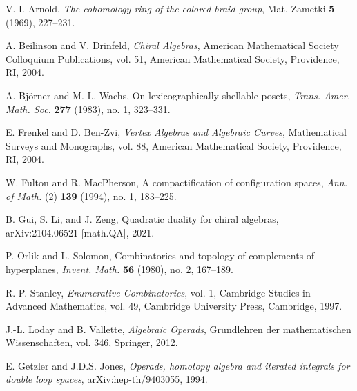 

\begin{thebibliography}{99}

V. I. Arnold, \emph{The cohomology ring of the colored braid group}, 
Mat. Zametki \textbf{5} (1969), 227--231.

 A. Beilinson and V. Drinfeld, \emph{Chiral Algebras}, American Mathematical Society Colloquium Publications, vol. 51, American Mathematical Society, Providence, RI, 2004.
 
 A. Björner and M. L. Wachs, On lexicographically shellable posets, \emph{Trans. Amer. Math. Soc.} \textbf{277} (1983), no. 1, 323--331.
 
 E. Frenkel and D. Ben-Zvi, \emph{Vertex Algebras and Algebraic Curves}, Mathematical Surveys and Monographs, vol. 88, American Mathematical Society, Providence, RI, 2004.
 
 W. Fulton and R. MacPherson, A compactification of configuration spaces, \emph{Ann. of Math.} (2) \textbf{139} (1994), no. 1, 183--225.
 
 B. Gui, S. Li, and J. Zeng, Quadratic duality for chiral algebras, arXiv:2104.06521 [math.QA], 2021.
 
 P. Orlik and L. Solomon, Combinatorics and topology of complements of hyperplanes, \emph{Invent. Math.} \textbf{56} (1980), no. 2, 167--189.
 
 R. P. Stanley, \emph{Enumerative Combinatorics}, vol. 1, Cambridge Studies in Advanced Mathematics, vol. 49, Cambridge University Press, Cambridge, 1997.

 J.-L. Loday and B. Vallette, \emph{Algebraic Operads}, Grundlehren der mathematischen Wissenschaften, vol. 346, Springer, 2012.

 E. Getzler and J.D.S. Jones, \emph{Operads, homotopy algebra and iterated integrals for double loop spaces}, arXiv:hep-th/9403055, 1994.
 
\end{thebibliography}
